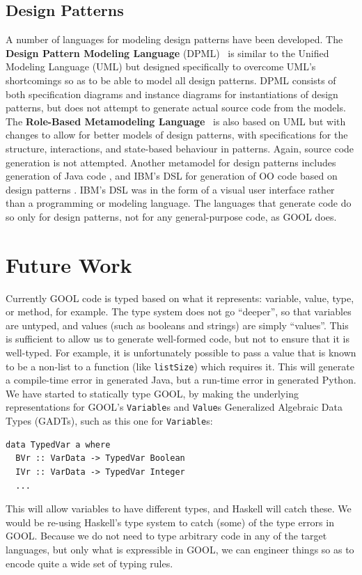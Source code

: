 \documentclass[sigplan,review,anonymous,prologue,dvipsnames]{acmart}
\begin{document}
\subsection{Design Patterns}

A number of languages for modeling design patterns have been developed. The
\textbf{Design Pattern Modeling Language} (DPML)~\cite{mapelsden2002design} is similar
to the Unified Modeling Language (UML) but designed specifically to overcome
UML's shortcomings so as to be able to model all design patterns. DPML consists of
both specification diagrams and instance diagrams for instantiations of design
patterns, but does not attempt to generate actual source code from the models.
The \textbf{Role-Based Metamodeling Language}~\cite{kim2003uml} is also based on UML but
with changes to allow for better models of design patterns, with specifications
for the structure, interactions, and state-based behaviour in patterns. Again,
source code generation is not attempted. Another metamodel for design patterns
includes generation of Java code \cite{albin2001meta}, and IBM's DSL
for generation of OO code based on design patterns
\cite{budinsky1996automatic}. IBM's DSL was in the form of a visual user
interface rather than a programming or modeling language. The languages that
generate code do so only for design patterns, not for any general-purpose code,
as GOOL does.

\section{Future Work} \label{sec:future}

Currently GOOL code is typed based on what it represents:
variable, value, type, or method, for example. The type system does not
go ``deeper'', so that variables are untyped, and values (such as booleans
and strings) are simply ``values''.  This is sufficient to allow us to
generate well-formed code, but not to ensure that it is well-typed.
For example, it is unfortunately possible to pass a value that is known
to be a non-list to a function (like \verb|listSize|) which requires it.
This will generate a compile-time error in generated Java, but a run-time error
in generated Python.  We have started to statically type GOOL, by making
the underlying representations for 
GOOL's \verb|Variable|s and \verb|Value|s Generalized Algebraic Data Types
(GADTs), such as this one for \verb|Variable|s:
\begin{lstlisting}
data TypedVar a where
  BVr :: VarData -> TypedVar Boolean
  IVr :: VarData -> TypedVar Integer
  ...
\end{lstlisting}
This will allow variables to have different types, and Haskell will catch
these. We would be re-using Haskell's type system to catch (some) of the
type errors in GOOL.  Because we do not need to type arbitrary code in any
of the target languages, but only what is expressible in GOOL, we can
engineer things so as to encode quite a wide set of typing rules.
\end{document}
